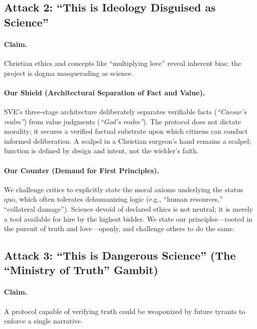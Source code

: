\documentclass[11pt,a4paper]{article}
\begin{document}
\vspace{1em}

\subsection*{\textcolor{accentcolor}{Attack 2: ``This is Ideology Disguised as Science''}}

\paragraph{\textbf{Claim.}} Christian ethics and concepts like ``multiplying love'' reveal inherent bias; the project is dogma masquerading as science.

\paragraph{\textbf{Our Shield (Architectural Separation of Fact and Value).}} SVE's three-stage architecture deliberately separates verifiable facts (\textit{``Caesar's realm''}) from value judgments (\textit{``God's realm''}). The protocol does not dictate morality; it secures a verified factual substrate upon which citizens can conduct informed deliberation. A scalpel in a Christian surgeon's hand remains a scalpel; function is defined by design and intent, not the wielder's faith.

\paragraph{\textbf{Our Counter (Demand for First Principles).}} We challenge critics to explicitly state the moral axioms underlying the status quo, which often tolerates dehumanizing logic (e.g., ``human resources,'' ``collateral damage''). Science devoid of declared ethics is not neutral; it is merely a tool available for hire by the highest bidder. We state our principles—rooted in the pursuit of truth and love—openly, and challenge others to do the same.

\vspace{1em}

\subsection*{\textcolor{accentcolor}{Attack 3: ``This is Dangerous Science'' (The ``Ministry of Truth'' Gambit)}}

\paragraph{\textbf{Claim.}} A protocol capable of verifying truth could be weaponized by future tyrants to enforce a single narrative.
\end{document}
